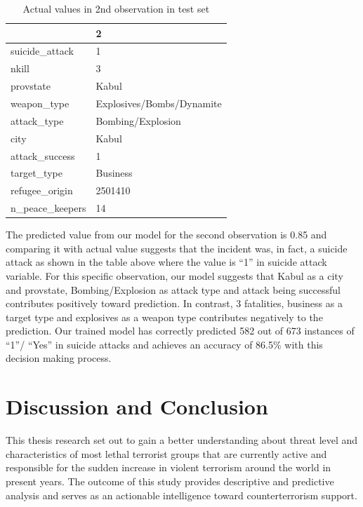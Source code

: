 \documentclass[11pt,oneside,a4paper]{reedthesis}
\begin{document}
\begin{table}[H]

\caption{\label{tab:unnamed-chunk-139}Actual values in 2nd observation in test set}
\centering
\fontsize{12}{14}\selectfont
\begin{tabular}[t]{ll}
\toprule
  & 2\\
\midrule
suicide\_attack & 1\\
nkill & 3\\
provstate & Kabul\\
weapon\_type & Explosives/Bombs/Dynamite\\
attack\_type & Bombing/Explosion\\
\addlinespace
city & Kabul\\
attack\_success & 1\\
target\_type & Business\\
refugee\_origin & 2501410\\
n\_peace\_keepers & 14\\
\bottomrule
\end{tabular}
\end{table}
The predicted value from our model for the second observation is 0.85
and comparing it with actual value suggests that the incident was, in
fact, a suicide attack as shown in the table above where the value is
``1'' in suicide attack variable. For this specific observation, our
model suggests that Kabul as a city and provstate, Bombing/Explosion as
attack type and attack being successful contributes positively toward
prediction. In contrast, 3 fatalities, business as a target type and
explosives as a weapon type contributes negatively to the prediction.
Our trained model has correctly predicted 582 out of 673 instances of
``1''/ ``Yes'' in suicide attacks and achieves an accuracy of 86.5\%
with this decision making process.

\chapter{Discussion and Conclusion}\label{conclusion}

This thesis research set out to gain a better understanding about threat
level and characteristics of most lethal terrorist groups that are
currently active and responsible for the sudden increase in violent
terrorism around the world in present years. The outcome of this study
provides descriptive and predictive analysis and serves as an actionable
intelligence toward counterterrorism support.
\end{document}
